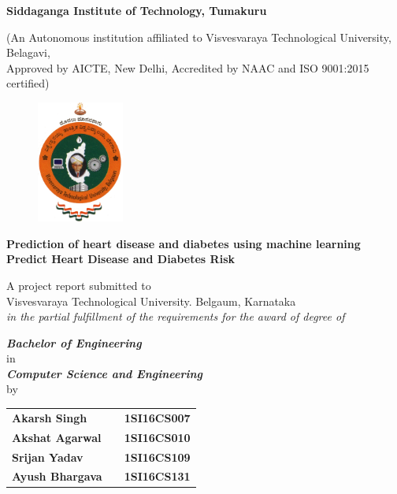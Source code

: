 \begin{titlingpage}

\thispagestyle{empty}
\centering

\setlength{\toptafiddle}{1in}
\setlength{\bottafiddle}{1in}

\vspace*{-0.75in}
\enlargethispage{\toptafiddle}

\begin{LARGE}
\textbf{Siddaganga Institute of Technology, Tumakuru}\\
\end{LARGE}

\begin{small}

(An Autonomous institution affiliated to Visvesvaraya Technological University, Belagavi,\\ Approved by AICTE, New Delhi, Accredited by NAAC and ISO 9001:2015 certified)
\end{small}

\begin{figure}[h]
    \centering
    \includegraphics[height=4cm]{images/vtu.png}
\end{figure}

\vfill
\Huge{\textbf{\textcolor{therablue}{Prediction of heart disease and diabetes using machine learning}}}\\
\Large{\textbf{Predict Heart Disease and Diabetes Risk}}
\vfill

\begin{small}
A project report submitted to \\Visvesvaraya Technological University. Belgaum, Karnataka \\
\textit{in the partial fulfillment of the requirements for the award of degree of} \\
\end{small}
\begin{normalsize}
\textbf{\textit{Bachelor of Engineering }} \\
in \\
\textbf{\textit{Computer Science and Engineering}} \\
by \\
\end{normalsize}
\vfill
\begin{tabular}{lcc}
\textbf{Akarsh Singh }&  & \textbf{1SI16CS007}\\
\textbf{Akshat Agarwal }&  & \textbf{1SI16CS010}\\
\textbf{Srijan Yadav }&  & \textbf{1SI16CS109}\\
\textbf{Ayush Bhargava }&  & \textbf{1SI16CS131}\\
\end{tabular}
\vfill


\end{titlingpage}
